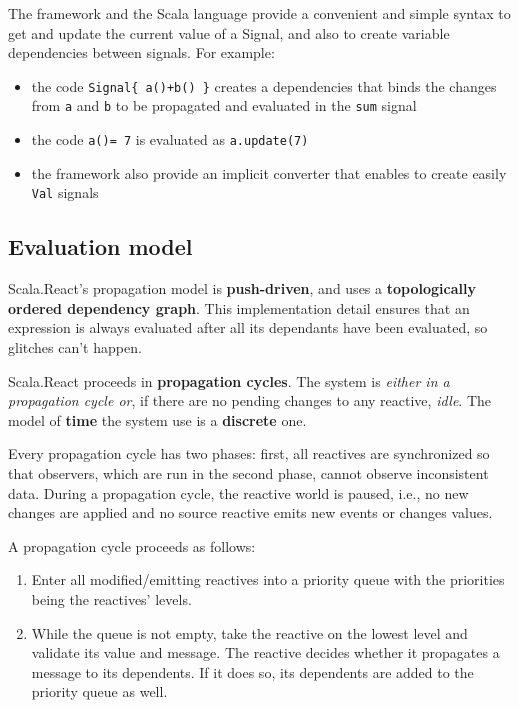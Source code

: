 The framework and the Scala language provide a convenient and simple
syntax to get and update the current value of a Signal, and also to
create variable dependencies between signals. For example:

\begin{itemize}
\itemsep1pt\parskip0pt
\item
  the code \texttt{Signal\{\ a()+b()\ \}} creates a dependencies that
  binds the changes from \texttt{a} and \texttt{b} to be propagated and
  evaluated in the \texttt{sum} signal
\item
  the code \texttt{a()=\ 7} is evaluated as \texttt{a.update(7)}
\item
  the framework also provide an implicit converter that enables to
  create easily \texttt{Val} signals
\end{itemize}


\subsection{Evaluation model}\label{evaluation-model}

Scala.React's propagation model is \textbf{push-driven}, and uses a
\textbf{topologically ordered dependency graph}. This implementation
detail ensures that an expression is always evaluated after all its
dependants have been evaluated, so glitches can't happen.

Scala.React proceeds in \textbf{propagation cycles}. The system is
\emph{either in a propagation cycle or}, if there are no pending changes
to any reactive, \emph{idle}. The model of \textbf{time} the system use
is a \textbf{discrete} one.

Every propagation cycle has two phases: first, all reactives are
synchronized so that observers, which are run in the second phase,
cannot observe inconsistent data. During a propagation cycle, the
reactive world is paused, i.e., no new changes are applied and no source
reactive emits new events or changes values.

A propagation cycle proceeds as follows:

\begin{enumerate}
\def\labelenumi{\arabic{enumi}.}
\itemsep1pt\parskip0pt
\item
  Enter all modified/emitting reactives into a priority queue with the
  priorities being the reactives' levels.
\item
  While the queue is not empty, take the reactive on the lowest level
  and validate its value and message. The reactive decides whether it
  propagates a message to its dependents. If it does so, its dependents
  are added to the priority queue as well.
\end{enumerate}

